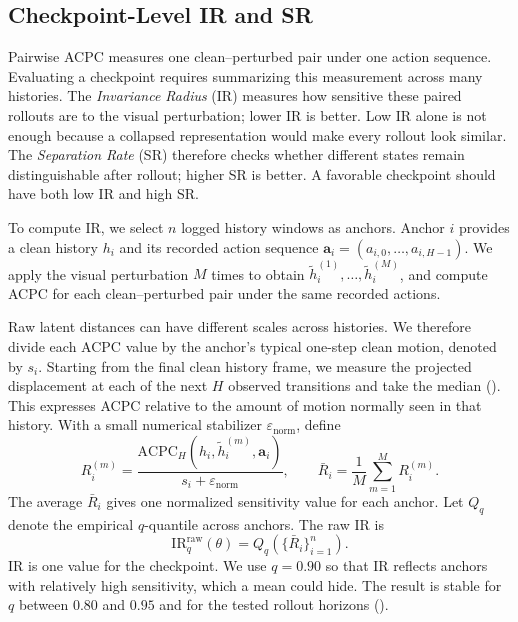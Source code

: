 \documentclass[10pt]{article}
\begin{document}
\subsection{Checkpoint-Level IR and SR}\label{sec:acpc-ir-sr}

Pairwise ACPC measures one clean--perturbed pair under one action sequence.
Evaluating a checkpoint requires summarizing this measurement across many
histories. The \emph{Invariance Radius} (IR) measures how sensitive these
paired rollouts are to the visual perturbation; lower IR is better. Low IR
alone is not enough because a collapsed representation would make every
rollout look similar. The \emph{Separation Rate} (SR) therefore checks whether
different states remain distinguishable after rollout; higher SR is better.
A favorable checkpoint should have both low IR and high SR.

To compute IR, we select $n$ logged history windows as anchors. Anchor $i$
provides a clean history $h_i$ and its recorded action sequence
$\mathbf a_i=(a_{i,0},\ldots,a_{i,H-1})$. We apply the visual perturbation $M$
times to obtain $\tilde h_i^{(1)},\ldots,\tilde h_i^{(M)}$, and compute ACPC
for each clean--perturbed pair under the same recorded actions.

Raw latent distances can have different scales across histories. We therefore
divide each ACPC value by the anchor's typical one-step clean motion, denoted
by $s_i$. Starting from the final clean history frame, we measure the
projected displacement at each of the next $H$ observed transitions and take
the median
(). This expresses ACPC
relative to the amount of motion normally seen in that history. With a small
numerical stabilizer $\varepsilon_{\mathrm{norm}}$, define
\begin{equation}
R_i^{(m)}
=
\frac{
\mathrm{ACPC}_H(h_i,\tilde h_i^{(m)},\mathbf a_i)
}{s_i+\varepsilon_{\mathrm{norm}}},
\qquad
\bar R_i=\frac{1}{M}\sum_{m=1}^{M}R_i^{(m)}.
\label{eq:normalized-same-state-radius}
\end{equation}
The average $\bar R_i$ gives one normalized sensitivity value for each anchor.
Let $Q_q$ denote the empirical $q$-quantile across anchors. The raw IR is
\begin{equation}
\mathrm{IR}^{\mathrm{raw}}_q(\theta)
=Q_q\!\left(\{\bar R_i\}_{i=1}^{n}\right).
\label{eq:ir-raw}
\end{equation}
IR is one value for the checkpoint. We use $q=0.90$ so that IR reflects
anchors with relatively high sensitivity, which a mean could hide. The result
is stable for $q$ between $0.80$ and $0.95$ and for the tested rollout
horizons ().
\end{document}

